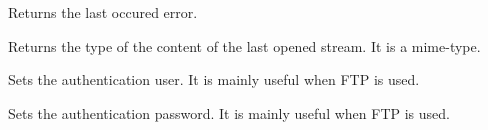 


Returns the last occured error.




Returns the type of the content of the last opened stream. It is a mime-type.




Sets the authentication user. It is mainly useful when FTP is used.



Sets the authentication password. It is mainly useful when FTP is used.
